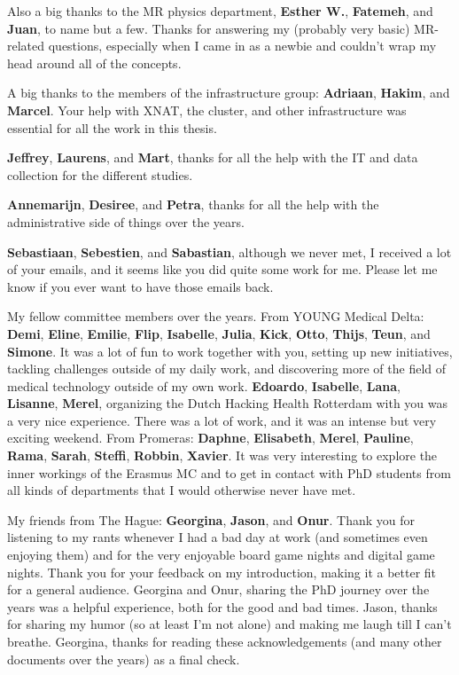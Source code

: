 Also a big thanks to the MR physics department, \textbf{Esther W.}, \textbf{Fatemeh}, and \textbf{Juan}, to name but a few.
Thanks for answering my (probably very basic) MR-related questions, especially when I came in as a newbie and couldn't wrap my head around all of the concepts.

A big thanks to the members of the infrastructure group: \textbf{Adriaan}, \textbf{Hakim}, and \textbf{Marcel}.
Your help with XNAT, the cluster, and other infrastructure was essential for all the work in this thesis.

\textbf{Jeffrey}, \textbf{Laurens}, and \textbf{Mart}, thanks for all the help with the IT and data collection for the different studies.

\textbf{Annemarijn}, \textbf{Desiree}, and \textbf{Petra}, thanks for all the help with the administrative side of things over the years.

\textbf{Sebastiaan}, \textbf{Sebestien}, and \textbf{Sabastian}, although we never met, I received a lot of your emails, and it seems like you did quite some work for me.
Please let me know if you ever want to have those emails back.

My fellow committee members over the years.
From YOUNG Medical Delta: \textbf{Demi}, \textbf{Eline}, \textbf{Emilie}, \textbf{Flip}, \textbf{Isabelle}, \textbf{Julia}, \textbf{Kick}, \textbf{Otto}, \textbf{Thijs}, \textbf{Teun}, and \textbf{Simone}.
It was a lot of fun to work together with you, setting up new initiatives, tackling challenges outside of my daily work, and discovering more of the field of medical technology outside of my own work.
\textbf{Edoardo}, \textbf{Isabelle}, \textbf{Lana}, \textbf{Lisanne}, \textbf{Merel}, organizing the Dutch Hacking Health Rotterdam with you was a very nice experience.
There was a lot of work, and it was an intense but very exciting weekend.
From Promeras: \textbf{Daphne}, \textbf{Elisabeth}, \textbf{Merel}, \textbf{Pauline}, \textbf{Rama}, \textbf{Sarah}, \textbf{Steffi}, \textbf{Robbin}, \textbf{Xavier}.
It was very interesting to explore the inner workings of the Erasmus MC and to get in contact with PhD students from all kinds of departments that I would otherwise never have met.

My friends from The Hague: \textbf{Georgina}, \textbf{Jason}, and \textbf{Onur}.
Thank you for listening to my rants whenever I had a bad day at work (and sometimes even enjoying them) and for the very enjoyable board game nights and digital game nights.
Thank you for your feedback on my introduction, making it a better fit for a general audience.
Georgina and Onur, sharing the PhD journey over the years was a helpful experience, both for the good and bad times.
Jason, thanks for sharing my humor (so at least I'm not alone) and making me laugh till I can't breathe.
Georgina, thanks for reading these acknowledgements (and many other documents over the years) as a final check.

